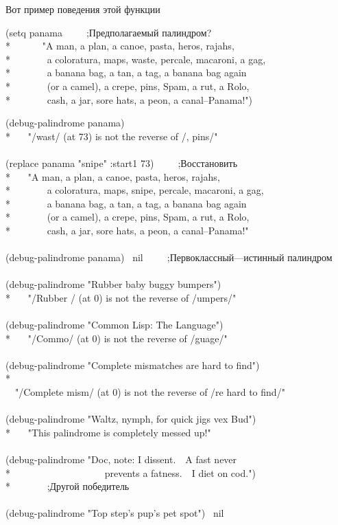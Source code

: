 Вот пример поведения этой функции
\begin{lisp}
(setq panama~~~~~;\textrm{Предполагаемый палиндром?} \\*
~~~~~~"A man, a plan, a canoe, pasta, heros, rajahs, \\*
~~~~~~~a coloratura, maps, waste, percale, macaroni, a gag, \\*
~~~~~~~a banana bag, a tan, a tag, a banana bag again \\*
~~~~~~~(or a camel), a crepe, pins, Spam, a rut, a Rolo, \\*
~~~~~~~cash, a jar, sore hats, a peon, a canal--Panama!")
\end{lisp}
\begin{lisp}
(debug-palindrome panama) \\*
~~\EV\ "/wast/ (at 73) is not the reverse of /, pins/" \\
\\
(replace panama "snipe" :start1 73)~~~~~;\textrm{Восстановить} \\*
~~\EV\ "A man, a plan, a canoe, pasta, heros, rajahs, \\*
~~~~~~~a coloratura, maps, snipe, percale, macaroni, a gag, \\*
~~~~~~~a banana bag, a tan, a tag, a banana bag again \\*
~~~~~~~(or a camel), a crepe, pins, Spam, a rut, a Rolo, \\*
~~~~~~~cash, a jar, sore hats, a peon, a canal--Panama!" \\
\\
(debug-palindrome panama) \EV\ nil~~~~~;\textrm{Первоклассный---истинный палиндром} \\
\\
(debug-palindrome "Rubber baby buggy bumpers") \\*
~~\EV\ "/Rubber / (at 0) is not the reverse of /umpers/" \\
\\
(debug-palindrome "Common Lisp: The Language") \\*
~~\EV\ "/Commo/ (at 0) is not the reverse of /guage/" \\
\\
(debug-palindrome "Complete mismatches are hard to find") \\*
~~\EV\ \\
~~"/Complete mism/ (at 0) is not the reverse of /re hard to find/" \\
\\
(debug-palindrome "Waltz, nymph, for quick jigs vex Bud") \\*
~~\EV\ "This palindrome is completely messed up!" \\
\\
(debug-palindrome "Doc, note: I dissent.~~A fast never \\*
~~~~~~~~~~~~~~~~~~~prevents a fatness.~~I diet on cod.") \\*
~~\EV\nil~~~~~;\textrm{Другой победитель} \\
\\
(debug-palindrome "Top step's pup's pet spot") \EV\ nil
\end{lisp}

